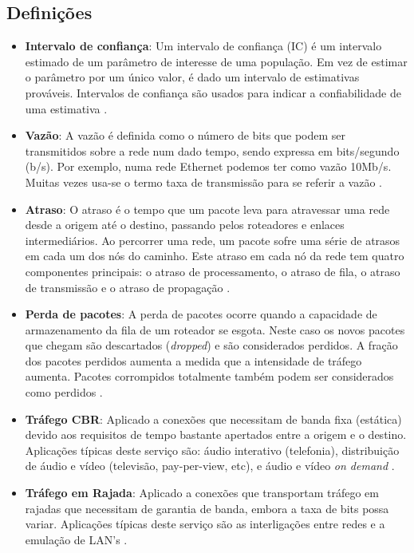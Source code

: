 \documentclass[12pt]{article}
\begin{document}

\subsection{Definições}

\begin{itemize}
    \item \textbf{Intervalo de confiança}: Um intervalo de confiança (IC) é um intervalo estimado de um parâmetro de interesse de uma população. Em vez de estimar o parâmetro por um único valor, é dado um intervalo de estimativas prováveis. Intervalos de confiança são usados para indicar a confiabilidade de uma estimativa \cite{shimakura2012}.
    \item \textbf{Vazão}: A vazão é definida como o número de bits que podem ser transmitidos sobre a rede num dado tempo, sendo expressa em bits/segundo (b/s). Por exemplo, numa rede Ethernet podemos ter como vazão 10Mb/s. Muitas vezes usa-se o termo taxa de transmissão para se referir a vazão \cite{ifprvazao}.
    \item \textbf{Atraso}: O atraso é o tempo que um pacote leva para atravessar uma rede desde a origem até o destino, passando pelos roteadores e enlaces intermediários. Ao percorrer uma rede, um pacote sofre uma série de atrasos em cada um dos nós do caminho. Este atraso em cada nó da rede tem quatro componentes principais: o atraso de processamento, o atraso de fila, o atraso de transmissão e o atraso de propagação \cite{ifprvazao}.
    \item \textbf{Perda de pacotes}: A perda de pacotes ocorre quando a capacidade de armazenamento da fila de um roteador se esgota. Neste caso os novos pacotes que chegam são descartados (\textit{dropped}) e são considerados perdidos. A fração dos pacotes perdidos aumenta a medida que a intensidade de tráfego aumenta. Pacotes corrompidos totalmente também podem ser considerados como perdidos \cite{ifprvazao}.
    \item \textbf{Tráfego CBR}: Aplicado a conexões que necessitam de banda fixa (estática) devido aos requisitos de tempo bastante apertados entre a origem e o destino. Aplicações típicas deste serviço são: áudio interativo (telefonia), distribuição de áudio e vídeo (televisão, pay-per-view, etc), e áudio e vídeo \textit{on demand} \cite{em2012disponivel}.
    \item \textbf{Tráfego em Rajada}: Aplicado a conexões que transportam tráfego em rajadas que necessitam de garantia de banda, embora a taxa de bits possa variar. Aplicações típicas deste serviço são as interligações entre redes e a emulação de LAN’s \cite{em2012disponivel}.
\end{itemize}
\end{document}
